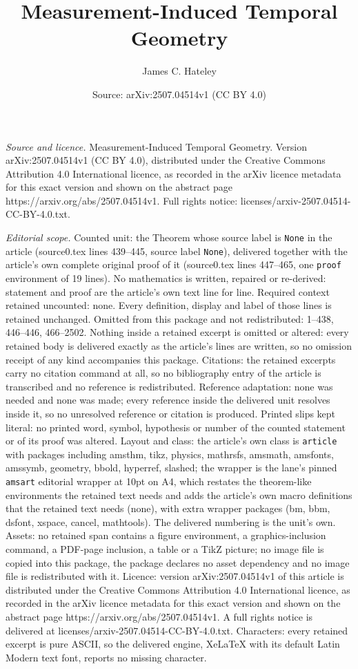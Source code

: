 \documentclass[10pt,a4paper]{amsart}
\title[Measurement-Induced Temporal Geometry]{Measurement-Induced Temporal Geometry}
\author{James C. Hateley}
\date{Source: arXiv:2507.04514v1 (CC BY 4.0)}
\begin{document}
\maketitle

\noindent\emph{Source and licence.} Measurement-Induced Temporal Geometry. Version arXiv:2507.04514v1 (CC BY 4.0), distributed under the Creative Commons Attribution 4.0 International licence, as recorded in the arXiv licence metadata for this exact version and shown on the abstract page https://arxiv.org/abs/2507.04514v1. Full rights notice: licenses/arxiv-2507.04514-CC-BY-4.0.txt.\par\smallskip

\noindent\textit{Editorial scope.} Counted unit: the Theorem whose source label is \texttt{None} in the article (source0.tex lines 439--445, source label \texttt{None}), delivered together with the article's own complete original proof of it (source0.tex lines 447--465, one \texttt{proof} environment of 19 lines). No mathematics is written, repaired or re-derived: statement and proof are the article's own text line for line. Required context retained uncounted: none. Every definition, display and label of those lines is retained unchanged. Omitted from this package and not redistributed: 1--438, 446--446, 466--2502. Nothing inside a retained excerpt is omitted or altered: every retained body is delivered exactly as the article's lines are written, so no omission receipt of any kind accompanies this package. Citations: the retained excerpts carry no citation command at all, so no bibliography entry of the article is transcribed and no reference is redistributed. Reference adaptation: none was needed and none was made; every reference inside the delivered unit resolves inside it, so no unresolved reference or citation is produced. Printed slips kept literal: no printed word, symbol, hypothesis or number of the counted statement or of its proof was altered. Layout and class: the article's own class is \texttt{article} with packages including amsthm, tikz, physics, mathrsfs, amsmath, amsfonts, amssymb, geometry, bbold, hyperref, slashed; the wrapper is the lane's pinned \texttt{amsart} editorial wrapper at 10pt on A4, which restates the theorem-like environments the retained text needs and adds the article's own macro definitions that the retained text needs (none), with extra wrapper packages (bm, bbm, dsfont, xspace, cancel, mathtools). The delivered numbering is the unit's own. Assets: no retained span contains a figure environment, a graphics-inclusion command, a PDF-page inclusion, a table or a TikZ picture; no image file is copied into this package, the package declares no asset dependency and no image file is redistributed with it. Licence: version arXiv:2507.04514v1 of this article is distributed under the Creative Commons Attribution 4.0 International licence, as recorded in the arXiv licence metadata for this exact version and shown on the abstract page https://arxiv.org/abs/2507.04514v1. A full rights notice is delivered at licenses/arxiv-2507.04514-CC-BY-4.0.txt. Characters: every retained excerpt is pure ASCII, so the delivered engine, XeLaTeX with its default Latin Modern text font, reports no missing character.
\end{document}
